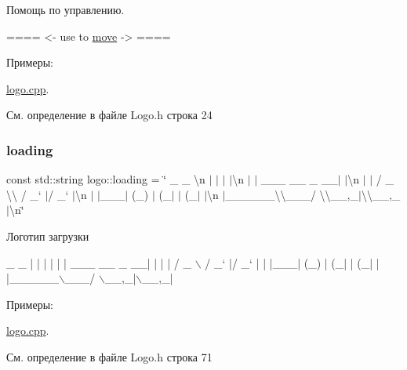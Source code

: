 Помощь по управлению. 
\begin{DoxyCode}
==== <- use to \hyperlink{namespacelogo_a03b6b80b5648e7dbbbf00b258df733b6}{move} -> ====
\end{DoxyCode}
 \begin{Desc}
\item[Примеры\+: ]\par
\hyperlink{logo_8cpp-example}{logo.\+cpp}.\end{Desc}


См. определение в файле Logo.\+h строка 24

\mbox{\label{namespacelogo_ad29ac81055f7eb3624a283f55af8d5ad}} 
\subsubsection{\texorpdfstring{loading}{loading}}
{\footnotesize\ttfamily const std\+::string logo\+::loading = \char`\"{} \+\_\+ \+\_\+ \textbackslash{}n $\vert$ $\vert$ $\vert$ $\vert$\textbackslash{}n $\vert$ $\vert$ \+\_\+\+\_\+\+\_\+ \+\_\+\+\_\+ \+\_\+ \+\_\+\+\_\+$\vert$ $\vert$\textbackslash{}n $\vert$ $\vert$ / \+\_\+ \textbackslash{}\textbackslash{} / \+\_\+` $\vert$/ \+\_\+` $\vert$\textbackslash{}n $\vert$ $\vert$\+\_\+\+\_\+\+\_\+$\vert$ (\+\_\+) $\vert$ (\+\_\+$\vert$ $\vert$ (\+\_\+$\vert$ $\vert$\textbackslash{}n $\vert$\+\_\+\+\_\+\+\_\+\+\_\+\+\_\+\+\_\+\textbackslash{}\textbackslash{}\+\_\+\+\_\+\+\_\+/ \textbackslash{}\textbackslash{}\+\_\+\+\_\+,\+\_\+$\vert$\textbackslash{}\textbackslash{}\+\_\+\+\_\+,\+\_\+$\vert$\textbackslash{}n\char`\"{}}

Логотип загрузки 
\begin{DoxyCode}
 \_                     \_ 
| |                   | |
| |     \_\_\_   \_\_ \_  \_\_| |
| |    / \_ \(\backslash\) / \_` |/ \_` |
| |\_\_\_| (\_) | (\_| | (\_| |
|\_\_\_\_\_\_\(\backslash\)\_\_\_/ \(\backslash\)\_\_,\_|\(\backslash\)\_\_,\_|  
\end{DoxyCode}
 \begin{Desc}
\item[Примеры\+: ]\par
\hyperlink{logo_8cpp-example}{logo.\+cpp}.\end{Desc}


См. определение в файле Logo.\+h строка 71

\mbox{\label{namespacelogo_a03b6b80b5648e7dbbbf00b258df733b6}} 
